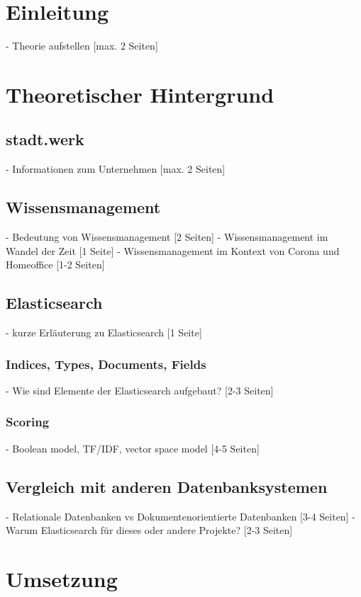 \section{Einleitung}
    - Theorie aufstellen [max. 2 Seiten] 

\section{Theoretischer Hintergrund}

\subsection{stadt.werk}
    - Informationen zum Unternehmen [max. 2 Seiten]

\subsection{Wissensmanagement}
    - Bedeutung von Wissensmanagement [2 Seiten]
    - Wissensmanagement im Wandel der Zeit [1 Seite]
    - Wissensmanagement im Kontext von Corona und Homeoffice [1-2 Seiten]

\subsection{Elasticsearch}
    - kurze Erläuterung zu Elasticsearch [1 Seite]

\subsubsection{Indices, Types, Documents, Fields}
    - Wie sind Elemente der Elasticsearch aufgebaut? [2-3 Seiten]
    
\subsubsection{Scoring}
    - Boolean model, TF/IDF, vector space model [4-5 Seiten]
    
\subsection{Vergleich mit anderen Datenbanksystemen}
    - Relationale Datenbanken vs Dokumentenorientierte Datenbanken [3-4 Seiten]
    - Warum Elasticsearch für dieses oder andere Projekte? [2-3 Seiten]
    
\section{Umsetzung}

